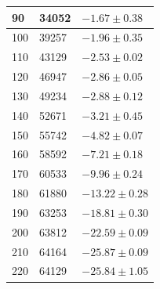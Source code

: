 \documentclass[../main.tex]{subfiles}
\begin{document}
\begin{table}[]
\begin{tabular}{|l|l|l|}
 			90                                                    & 34052                               & $-1.67 \pm 0.38$                                   \\ \hline
 			100                                                   & 39257                               & $-1.96 \pm 0.35$                                   \\ \hline
 			110                                                   & 43129                               & $-2.53 \pm 0.02$                                   \\ \hline
 			120                                                   & 46947                               & $-2.86 \pm 0.05$                                   \\ \hline
 			130                                                   & 49234                               & $-2.88 \pm 0.12$                                   \\ \hline
 			140                                                   & 52671                               & $-3.21 \pm 0.45$                                   \\ \hline
 			150                                                   & 55742                               & $-4.82 \pm 0.07$                                   \\ \hline
 			160                                                   & 58592                               & $-7.21 \pm 0.18$                                   \\ \hline
 			170                                                   & 60533                               & $-9.96 \pm 0.24$                                   \\ \hline
 			180                                                   & 61880                               & $-13.22 \pm 0.28$                                  \\ \hline
 			190                                                   & 63253                               & $-18.81\pm 0.30$                                   \\ \hline
 			200                                                   & 63812                               & $-22.59 \pm 0.09$                                  \\ \hline
 			210                                                   & 64164                               & $-25.87 \pm 0.09$                                  \\ \hline
 			220                                                   & 64129                               & $-25.84 \pm 1.05$                                  \\ \hline

\end{tabular}
\end{table}
\end{document}
